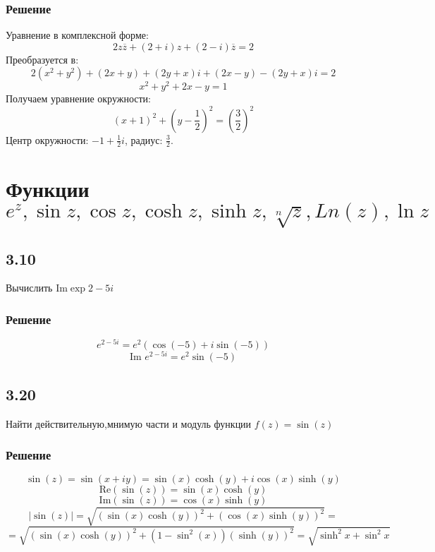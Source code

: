 \documentclass[12pt,a4paper]{article}
\begin{document}
\subsubsection*{Решение}
Уравнение в комплексной форме:
\[
2z\overline{z} + (2+i)z + (2-i)\overline{z} = 2
\]
Преобразуется в:
\[
2(x^2 + y^2) + (2x + y) +(2y+x)i +(2x - y) - (2y+x)i = 2
\]
\[
x^2 + y^2 + 2x - y = 1
\]
Получаем уравнение окружности:
\[
(x+1)^2 + \left(y-\frac{1}{2}\right)^2 = \left(\frac{3}{2}\right)^2
\]
Центр окружности: \(-1+\frac{1}{2}i\), радиус: \(\frac{3}{2}\).

\begin{center}
\end{center}

\section{Функции $e^z,\sin{z},\cos{z},\cosh{z},\sinh{z},\sqrt[n]{z},Ln(z),\ln{z}$}
\subsection*{3.10}
Вычислить $\text{Im} \exp{2-5i}$
\subsubsection*{Решение}
\[
e^{2-5i} = e^{2}(\cos(-5) + i\sin(-5))
\]
\[
\text{Im } e^{2-5i} = e^2 \sin(-5)
\]

\subsection*{3.20}
Найти действительную,мнимую части и модуль функции $f(z)=\sin(z)$
\subsubsection*{Решение}
\[
\sin(z) =\sin(x+iy)= \sin(x)\cosh(y) + i\cos(x)\sinh(y)
\]
\[
\text{Re}(\sin(z)) = \sin(x) \cosh(y)
\]
\[
\text{Im}(\sin(z)) = \cos(x) \sinh(y)
\]
\[
|\sin(z)| = \sqrt{(\sin(x) \cosh(y))^2 + (\cos(x) \sinh(y))^2}=
\]
\[
= \sqrt{(\sin(x) \cosh(y))^2 + (1-\sin^2(x))( \sinh(y))^2}=\sqrt{\sinh^2{x}+\sin^2{x}}
\]
\end{document}

